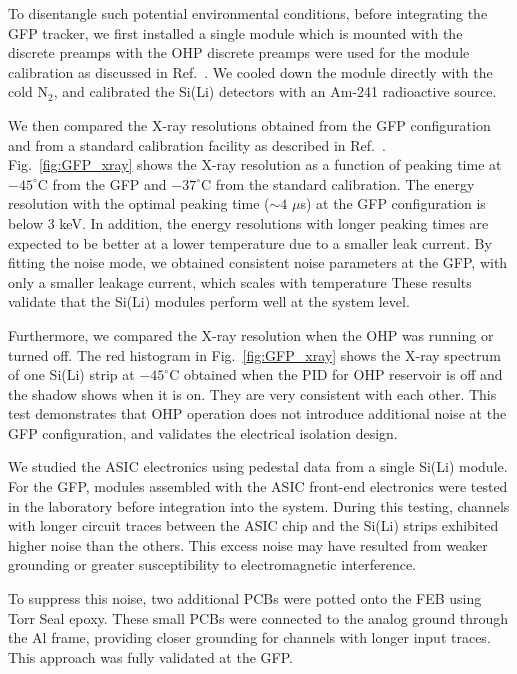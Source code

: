 To disentangle such potential environmental conditions, before integrating the \ac{GFP} tracker, we first installed a single module which is mounted with the discrete preamps with the \ac{OHP} discrete preamps were used for the module calibration as discussed in Ref.~\cite{10168972}. We cooled down the module directly with the cold N$_2$, and calibrated the \ac{Si(Li)} detectors with an Am-241 radioactive source. 

We then compared the X-ray resolutions obtained from the \ac{GFP} configuration and from a standard calibration facility as described in Ref.~\cite{10168972}. Fig.~\ref{fig:GFP_xray} shows the X-ray resolution as a function of peaking time at $-45^\circ$C from the \ac{GFP} and $-37^\circ$C from the standard calibration. The energy resolution with the optimal peaking time ($\sim 4$ $\mu$s) at the \ac{GFP} configuration is below 3 keV. In addition, the energy resolutions with longer peaking times are expected to be better at a lower temperature due to a smaller leak current. By fitting the noise mode, we obtained consistent noise parameters at the \ac{GFP}, with only a smaller leakage current, which scales with temperature These results validate that the \ac{Si(Li)} modules perform well at the system level.

Furthermore, we compared the X-ray resolution when the \ac{OHP} was running or turned off. The red histogram in Fig.~\ref{fig:GFP_xray} shows the X-ray spectrum of one \ac{Si(Li)} strip at $-45^\circ$C obtained when the PID for \ac{OHP} reservoir is off and the shadow shows when it is on. They are very consistent with each other. This test demonstrates that \ac{OHP} operation does not introduce additional noise at the \ac{GFP} configuration, and validates the electrical isolation design.

We studied the \ac{ASIC} electronics using pedestal data from a single \ac{Si(Li)} module. For the \ac{GFP}, modules assembled with the \ac{ASIC} front-end electronics were tested in the laboratory before integration into the system. During this testing, channels with longer circuit traces between the \ac{ASIC} chip and the \ac{Si(Li)} strips exhibited higher noise than the others. This excess noise may have resulted from weaker grounding or greater susceptibility to electromagnetic interference.

To suppress this noise, two additional PCBs were potted onto the FEB using Torr Seal epoxy. These small PCBs were connected to the analog ground through the Al frame, providing closer grounding for channels with longer input traces. This approach was fully validated at the \ac{GFP}.

